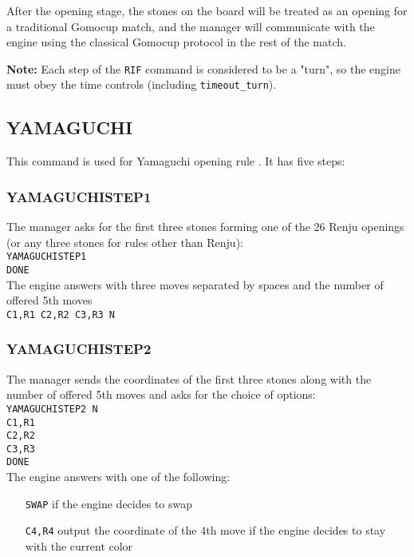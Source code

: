 \documentclass[12pt,a4paper]{article}
\begin{document}
After the opening stage, the stones on the board will be treated as an opening for a traditional Gomocup match, and the manager will communicate with the engine using the classical Gomocup protocol in the rest of the match.

\textbf{Note:} Each step of the \texttt{RIF} command is considered to be a "turn", so the engine must obey the time controls (including \texttt{timeout{\_}turn}).


\subsection{YAMAGUCHI}
\label{cmd_yamaguchi}
This command is used for Yamaguchi opening rule \cite{renju_opening_rules}. It has five steps:

\subsubsection{YAMAGUCHISTEP1}
The manager asks for the first three stones forming one of the 26 Renju openings (or any three stones for rules other than Renju):\\
\texttt{YAMAGUCHISTEP1}\\
\texttt{DONE}\\
The engine answers with three moves separated by spaces and the number of offered 5th moves\\
\texttt{C1,R1 C2,R2 C3,R3 N}

\subsubsection{YAMAGUCHISTEP2}
The manager sends the coordinates of the first three stones along with the number of offered 5th moves and asks for the choice of options:\\
\texttt{YAMAGUCHISTEP2 N}\\
\texttt{C1,R1}\\
\texttt{C2,R2}\\
\texttt{C3,R3}\\
\texttt{DONE}\\
The engine answers with one of the following:
\begin{enumerate}[leftmargin=7.5em]
\item[\texttt{SWAP}]{if the engine decides to swap}
\item[\texttt{C4,R4}]{output the coordinate of the 4th move if the engine decides to stay with the current color}
\end{enumerate}
\end{document}
